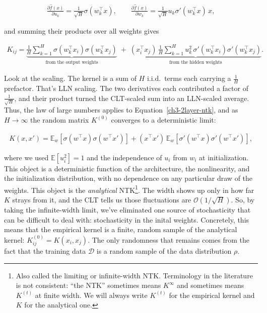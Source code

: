 \begin{align}
\frac{\partial \hat{f}(x)}{\partial u_k} = \frac{1}{\sqrt{H}}\sigma(w^\top_k x),
\qquad
\frac{\partial \hat{f}(x)}{\partial w_k} = \frac{1}{\sqrt{H}} u_k \sigma'(w^\top_k x)\, x,
\end{align}

and summing their products over all weights gives

\begin{align}
K_{ij} = \underbrace{\frac{1}{H}\sum^H_{k=1}\sigma(w^\top_k x_i)\sigma(w^\top_k x_j)}_{\text{from the
output weights}}
\;+\;
\underbrace{(x^\top_i x_j)\,\frac{1}{H}\sum^H_{k=1}u^2_k\,\sigma'(w^\top_k x_i)\sigma'(w^\top_k x_j)}
_{\text{from the hidden weights}}.
\label{ch3-2layer-ntk}
\end{align}

Look at the scaling. The kernel is a sum of $H$ i.i.d.\ terms each carrying a $\frac{1}{H}$ prefactor. 
That's LLN scaling. The two derivatives each contributed a factor of $\frac{1}{\sqrt H}$, and their product
turned the CLT-scaled sum into an LLN-scaled average. Thus, the law of large numbers applies to Equation~\eqref{ch3-2layer-ntk}, and as $H\to\infty$ the
random matrix $K^{(0)}$ converges to a deterministic limit:

\begin{align}
K(x,x') = \mathbb{E}_{w}\left[\sigma(w^\top x)\sigma(w^\top x')\right]
+ (x^\top x')\,\mathbb{E}_{w}\left[\sigma'(w^\top x)\sigma'(w^\top x')\right],
\end{align}

where we used $\mathbb{E}[u^2_i]=1$ and the independence of $u_i$ from $w_i$ at initialization.
This object is a deterministic function of the architecture, the nonlinearity, and the
initialization distribution, with no dependence on any particular draw of the weights.
This object is the \textit{analytical} NTK\footnote{Also called the limiting or infinite-width NTK. Terminology in the
literature is not consistent: ``the NTK'' sometimes means $K^\infty$ and sometimes means $K^{(t)}$
at finite width. We will always write $K^{(t)}$ for the empirical kernel and $K$ for the
analytical one.}. The width shows up only in how far $K$ strays from it, and the CLT tells us
those fluctuations are $\mathcal{O}(1/\sqrt{H})$. So, by taking the infinite-width limit, we've eliminated one source of stochasticity that can be difficult to deal with: stochasticity in the inital weights. Concretely, this means that the empirical kernel is a finite, random sample of the analytical kernel: $K^{(0)}_{ij}=K(x_i,x_j)$. The only randomness that remains comes from the fact that the training data $\mathcal{D}$ is a random sample of the data distribution $\rho$.

